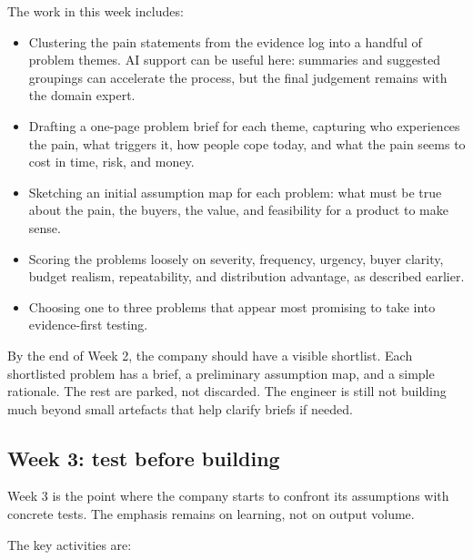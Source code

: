 \documentclass[10pt, a4paper, twocolumn]{article} %
\begin{document}
The work in this week includes:

\begin{itemize}
  \item Clustering the pain statements from the evidence log into a handful of problem themes. AI support can be useful here: summaries and suggested groupings can accelerate the process, but the final judgement remains with the domain expert.
  \item Drafting a one-page problem brief for each theme, capturing who experiences the pain, what triggers it, how people cope today, and what the pain seems to cost in time, risk, and money.
  \item Sketching an initial assumption map for each problem: what must be true about the pain, the buyers, the value, and feasibility for a product to make sense.
  \item Scoring the problems loosely on severity, frequency, urgency, buyer clarity, budget realism, repeatability, and distribution advantage, as described earlier.
  \item Choosing one to three problems that appear most promising to take into evidence-first testing.
\end{itemize}

By the end of Week 2, the company should have a visible shortlist. Each shortlisted problem has a brief, a preliminary assumption map, and a simple rationale. The rest are parked, not discarded. The engineer is still not building much beyond small artefacts that help clarify briefs if needed.

\newpage
\subsection{Week 3: test before building}

Week 3 is the point where the company starts to confront its assumptions with concrete tests. The emphasis remains on learning, not on output volume.

The key activities are:
\end{document}
